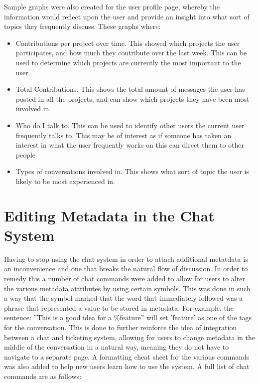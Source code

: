 \documentclass{l4proj}
\begin{document}
\newpage
Sample graphs were also created for the user profile page, whereby the information would reflect upon the user and provide an insight into what sort of topics they frequently discuss. These graphs where:

\begin{itemize}
\item Contributions per project over time.  This showed which projects the user participates, and how much they contribute over the last week.  This can be used to determine which projects are currently the most important to the user.
\item Total Contributions.  This shows the total amount of messages the user has posted in all the projects, and can show which projects they have been most involved in.
\item Who do I talk to.  This can be used to identify other users the current user frequently talks to.  This may be of interest as if someone has taken an interest in what the user frequently works on this can direct them to other people
\item Types of conversations involved in.  This shows what sort of topic the user is likely to be most experienced in. 
\end{itemize}

\section{Editing Metadata in the Chat System}

Having to stop using the chat system in order to attach additional metatdata is an inconvenience and one that breaks the natural flow of discussion.  In order to remedy this a number of chat commands were added to allow for users to alter the various metadata attributes by using certain symbols. This was done in such a way that the symbol marked that the word that immediately followed was a phrase that represented a value to be stored in metadata. For example, the sentence:
\newline
\newline
''This is a good idea for a \%feature''
\newline
\newline
will set 'feature' as one of the tags for the conversation.  This is done to further reinforce the idea of integration between a chat and ticketing system, allowing for users to change metadata in the middle of the conversation in a natural way, meaning they do not have to navigate to a separate page.  A formatting cheat sheet for the various commands was also added to help new users learn how to use the system.  A full list of chat commands are as follows:
\end{document}
